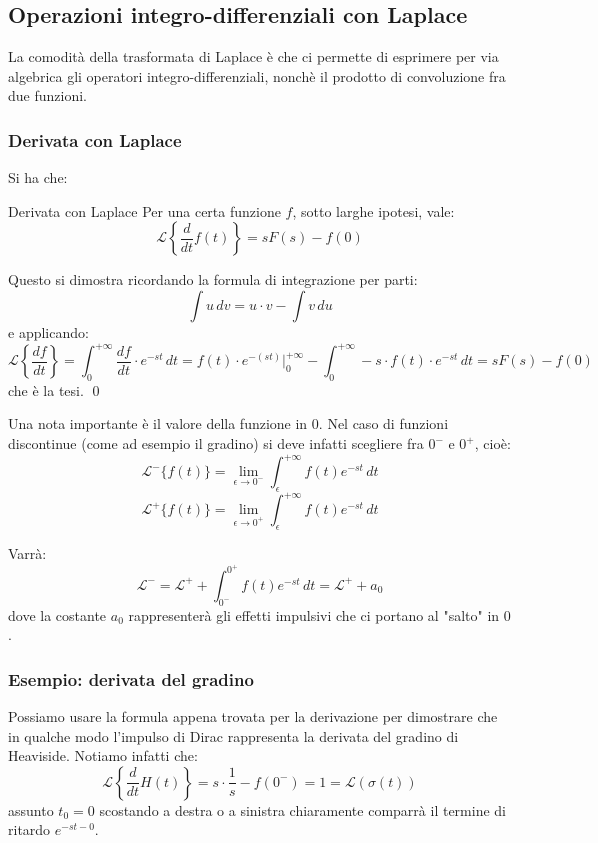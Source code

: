 \documentclass[a4paper,11pt]{article}
\begin{document}
\subsection{Operazioni integro-differenziali con Laplace}
La comodità della trasformata di Laplace è che ci permette di esprimere per via algebrica gli operatori integro-differenziali, nonchè il prodotto di convoluzione fra due funzioni.

\subsubsection{Derivata con Laplace}
Si ha che:
\begin{theorem}{Derivata con Laplace}
	Per una certa funzione $f$, sotto larghe ipotesi, vale:
	$$
	\mathcal{L}\left\{ \frac{d}{dt} f(t) \right\} = s F(s) - f(0)
	$$
\end{theorem}

Questo si dimostra ricordando la formula di integrazione per parti:
$$
\int u \, dv = u \cdot v - \int v \, du
$$
e applicando:
$$
\mathcal{L}\left\{ \frac{df}{dt} \right\} = \int_0^{+\infty} \frac{df}{dt} \cdot e^{-st} \, dt = f(t) \cdot e^{-(st)} \Big|_0^{+\infty} - \int_0^{+ \infty} -s \cdot f(t) \cdot e^{-st} \, dt = s F(s) - f(0)
$$ 
che è la tesi. \qed

Una nota importante è il valore della funzione in $0$.
Nel caso di funzioni discontinue (come ad esempio il gradino) si deve infatti scegliere fra $0^-$ e $0^+$, cioè:
$$
\mathcal{L}^{-} \{f(t)\} = \lim_{\epsilon \rightarrow 0^-} \int_\epsilon^{+ \infty} f(t) e^{-st} \, dt
$$
$$
\mathcal{L}^{+} \{f(t)\} = \lim_{\epsilon \rightarrow 0^+} \int_\epsilon^{+ \infty} f(t) e^{-st} \, dt
$$

Varrà:
$$
\mathcal{L}^{-} = \mathcal{L}^{+} + \int_{0^-}^{0^+} f(t) e^{-st} \, dt = \mathcal{L}^{+} + a_0
$$
dove la costante $a_0$ rappresenterà gli effetti impulsivi che ci portano al "salto" in $0$.

\subsubsection{Esempio: derivata del gradino}
Possiamo usare la formula appena trovata per la derivazione per dimostrare che in qualche modo l'impulso di Dirac rappresenta la derivata del gradino di Heaviside.
Notiamo infatti che:
$$
\mathcal{L}\left\{ \frac{d}{dt} H(t) \right\} = s \cdot \frac{1}{s} - f(0^-) = 1 = \mathcal{L}(\sigma(t))
$$
assunto $t_0 = 0$ scostando a destra o a sinistra chiaramente comparrà il termine di ritardo $e^{-s t-0}$.
\end{document}
